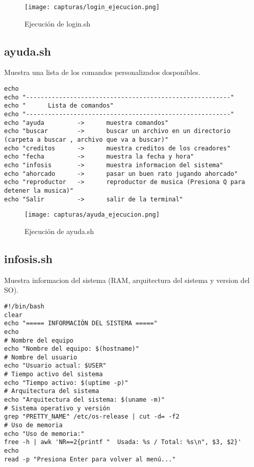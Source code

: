 \documentclass[12pt]{article}
\begin{document}
\begin{figure}[H]
    \centering
    \texttt{[image: capturas/login\_ejecucion.png]}
    \caption{Ejecución de login.sh}
\end{figure}


\newpage
\subsection{ayuda.sh}

Muestra una lista de los comandos personalizados dosponibles.

\begin{lstlisting}[caption={ayuda.sh}]
echo
echo "--------------------------------------------------------"
echo "      Lista de comandos"
echo "--------------------------------------------------------"
echo "ayuda         ->      muestra comandos"
echo "buscar        ->      buscar un archivo en un directorio (carpeta a buscar , archivo que va a buscar)"
echo "creditos      ->      muestra creditos de los creadores"
echo "fecha         ->      muestra la fecha y hora"
echo "infosis       ->      muestra informacion del sistema"
echo "ahorcado      ->      pasar un buen rato jugando ahorcado"
echo "reproductor   ->      reproductor de musica (Presiona Q para detener la musica)"
echo "Salir         ->      salir de la terminal"

\end{lstlisting}

\begin{figure}[H]
    \centering
    \texttt{[image: capturas/ayuda\_ejecucion.png]}
    \caption{Ejecución de ayuda.sh}
\end{figure}


\newpage
\subsection{infosis.sh}
Muestra informacion del sistema (RAM, arquitectura del sistema y version del SO).

\begin{lstlisting}[caption={infosis.sh}]
#!/bin/bash
clear
echo "===== INFORMACIÓN DEL SISTEMA ====="
echo
# Nombre del equipo
echo "Nombre del equipo: $(hostname)"
# Nombre del usuario
echo "Usuario actual: $USER"
# Tiempo activo del sistema
echo "Tiempo activo: $(uptime -p)"
# Arquitectura del sistema
echo "Arquitectura del sistema: $(uname -m)"
# Sistema operativo y versión
grep "PRETTY_NAME" /etc/os-release | cut -d= -f2
# Uso de memoria
echo "Uso de memoria:"
free -h | awk 'NR==2{printf "  Usada: %s / Total: %s\n", $3, $2}'
echo
read -p "Presiona Enter para volver al menú..."

\end{lstlisting}
\end{document}
